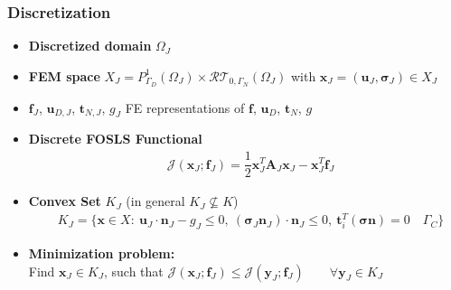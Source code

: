 \documentclass[8pt, oneside]{beamer}   	%
\newcommand{\bA}{\textbf{A}}
\newcommand{\bff}{\textbf{f}}
\newcommand{\bn}{\textbf{n}}
\newcommand{\bt}{\textbf{t}}
\newcommand{\bu}{\textbf{u}}
\newcommand{\by}{\textbf{y}}
\newcommand{\bbx}{\textbf{x}}
\newcommand{\bsigma}{\boldsymbol{\sigma}}
\newcommand{\RT}{\mathcal{RT}}
\newcommand{\titlecolor}[1]{\frametitle{\textcolor{dkgrey}{ \textbf{#1}}}}
\begin{document}


\begin{frame}
\titlecolor{Discretization}
\begin{itemize}
\item \textbf{Discretized domain} $\Omega_J$
\item \textbf{FEM space} $ X_J=P_{\Gamma_D}^1(\Omega_J) \times  \RT_{0,\Gamma_N}(\Omega_J)
$ with $\bbx_J= \left(\bu_J,\bsigma_J \right)  \in X_J$
\item $\bff_J$, $\bu_{D,J}$, $\bt_{N,J}$, $g_J$ FE representations of $\bff$, $\bu_D$, $\bt_N$, $g$
\item \textbf{Discrete FOSLS Functional}
\begin{align*}
&\mathcal{J}(\bbx_J;\bff_J)=\dfrac{1}{2} \bbx_J^T \bA_J \bbx_J - \bbx_J^T \bff_J
\end{align*} 
\item  
\textbf{Convex Set} $K_J$ (in general $K_J \nsubseteq  K$)
\begin{align*}
& K_J=\{ \bbx \in  X      : \: 
 \bu_J \cdot \bn_J - g_J  \leq 0, \:  (\bsigma_J \bn_J) \cdot \bn_J \leq 0,  \: \bt_i^T(\bsigma \bn) =0 \quad  \Gamma_C
 \}
\end{align*}
\item \textbf{Minimization problem:}\\
Find $\bbx_J \in K_J$, such that $
\mathcal{J}(\bbx_J;\bff_J) \leq \mathcal{J}(\by_J;\bff_J ) \qquad \forall \by_J \in K_J
$
\end{itemize}
\end{frame}

\end{document}
